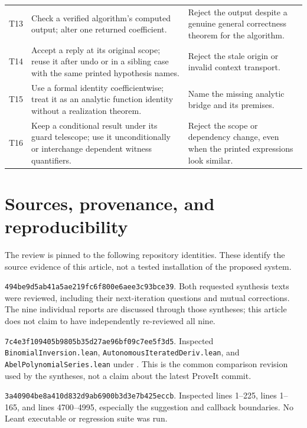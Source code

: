 \documentclass[11pt,letterpaper]{article}
\newcommand{\code}[1]{\nolinkurl{#1}}
\numberwithin{equation}{section}
\begin{document}
\begin{longtable}{@{}P{.06\textwidth}P{.44\textwidth}P{.42\textwidth}@{}}
T13 & Check a verified algorithm's computed output; alter one returned coefficient.
& Reject the output despite a genuine general correctness theorem for the
algorithm.\\
T14 & Accept a reply at its original scope; reuse it after undo or in a sibling
case with the same printed hypothesis names. & Reject the stale origin or
invalid context transport.\\
T15 & Use a formal identity coefficientwise; treat it as an analytic function
identity without a realization theorem. & Name the missing analytic bridge and
its premises.\\
T16 & Keep a conditional result under its guard telescope; use it unconditionally
or interchange dependent witness quantifiers. & Reject the scope or dependency
change, even when the printed expressions look similar.\\
\bottomrule
\end{longtable}

\clearpage
\section{Sources, provenance, and reproducibility}\label{app:sources}
The review is pinned to the following repository identities. These identify the
source evidence of this article, not a tested installation of the proposed
system.

\begin{description}[style=nextline]
\item[Brainstorm]
\code{494be9d5ab41a5ae219fc6f800e6aee3c93bce39}. Both requested synthesis texts
were reviewed, including their next-iteration questions and mutual corrections.
The nine individual reports are discussed through those syntheses; this article
does not claim to have independently re-reviewed all nine.
\item[ProveIt]
\code{7c4e3f109405b9805b35d27ae96bf09c7ee5f3d5}. Inspected
\code{BinomialInversion.lean}, \code{AutonomousIteratedDeriv.lean}, and
\code{AbelPolynomialSeries.lean} under
.
This is the common comparison revision used by the syntheses, not a claim about
the latest ProveIt commit.
\item[Leant]
\code{3a40904be8a410d832d9ab6900b3d3e7b425eccb}. Inspected
 lines 1--225,
 lines 1--165, and
 lines 4700--4995, especially the suggestion and callback
boundaries. No Leant executable or regression suite was run.
\end{description}
\end{document}
